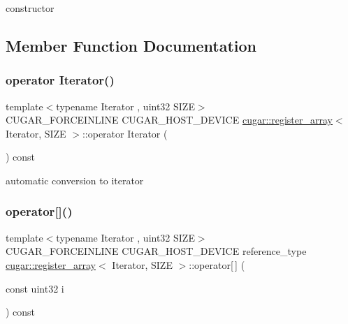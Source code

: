 constructor 

\subsection{Member Function Documentation}
\mbox{\label{structcugar_1_1register__array_a93d2f8025d49d09013ee5b4179cb8a3f}} 
\subsubsection{\texorpdfstring{operator Iterator()}{operator Iterator()}}
{\footnotesize\ttfamily template$<$typename Iterator , uint32 S\+I\+ZE$>$ \\
C\+U\+G\+A\+R\+\_\+\+F\+O\+R\+C\+E\+I\+N\+L\+I\+NE C\+U\+G\+A\+R\+\_\+\+H\+O\+S\+T\+\_\+\+D\+E\+V\+I\+CE \hyperlink{structcugar_1_1register__array}{cugar\+::register\+\_\+array}$<$ Iterator, S\+I\+ZE $>$\+::operator Iterator (\begin{DoxyParamCaption}{ }\end{DoxyParamCaption}) const\hspace{0.3cm}{\ttfamily [inline]}}

automatic conversion to iterator \mbox{\label{structcugar_1_1register__array_afb81e67899d46524ae21aee528c8c7e1}} 
\subsubsection{\texorpdfstring{operator[]()}{operator[]()}}
{\footnotesize\ttfamily template$<$typename Iterator , uint32 S\+I\+ZE$>$ \\
C\+U\+G\+A\+R\+\_\+\+F\+O\+R\+C\+E\+I\+N\+L\+I\+NE C\+U\+G\+A\+R\+\_\+\+H\+O\+S\+T\+\_\+\+D\+E\+V\+I\+CE reference\+\_\+type \hyperlink{structcugar_1_1register__array}{cugar\+::register\+\_\+array}$<$ Iterator, S\+I\+ZE $>$\+::operator\mbox{[}$\,$\mbox{]} (\begin{DoxyParamCaption}\item[{const uint32}]{i }\end{DoxyParamCaption}) const\hspace{0.3cm}{\ttfamily [inline]}}

